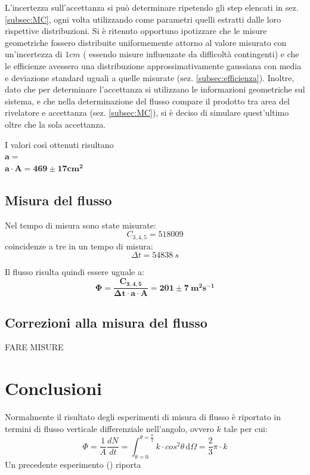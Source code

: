 \documentclass[11pt]{article}
\begin{document}
L'incertezza sull'accettanza si può determinare ripetendo gli step elencati in sez. \ref{subsec:MC}, ogni volta utilizzando come parametri quelli estratti dalle loro rispettive distribuzioni. Si è ritenuto opportuno ipotizzare che le misure geometriche fossero distribuite uniformemente attorno al valore misurato con un'incertezza di $1 cm$ ( essendo misure influenzate da difficoltà contingenti) e che le efficienze avessero una distribuzione approssimativamente gaussiana con media e deviazione standard uguali a quelle misurate (sez. \ref{subsec:efficienza}). Inoltre, dato che per determinare l'accettanza si utilizzano le informazioni geometriche sul sistema, e che nella determinazione del flusso compare il prodotto tra area del rivelatore e accettanza (sez. \ref{subsec:MC}), si è deciso di simulare quest'ultimo oltre che la sola accettanza.

I valori così ottenuti risultano \\
$
\mathbf{a = } 
$
\\
$
\mathbf{ a \cdot A =  469 \pm 17 cm^2}
$


\subsection{Misura del flusso}
Nel tempo di misura sono state misurate: \\
\begin{equation}
C_{3,4,5} = 518009
\nonumber
\end{equation}
coincidenze a tre in un tempo di misura: \\
\begin{equation}
\Delta t = 54838 \ s
\nonumber
\end{equation}

Il flusso risulta quindi essere uguale a: \\
\begin{equation}
\mathbf{\Phi = \frac{C_{3,4,5}}{\Delta t \cdot a \cdot A} = 201 \pm 7 \ m^2 s^{-1}} 
\nonumber
\end{equation}

\subsection{Correzioni alla misura del flusso}
FARE MISURE

\section{Conclusioni}
Normalmente il risultato degli esperimenti di misura di flusso è riportato in termini di flusso verticale differenziale nell'angolo, ovvero $k$ tale per cui:
\begin{equation}
\Phi = \frac{1}{A}\frac{dN}{dt}=\int_{\theta=0}^{\theta=\frac{\pi}{2}}  \! k\cdot cos^2{\theta} \, \mathrm{d}\Omega = \frac{2}{3}\pi\cdot k
\end{equation}
Un precedente esperimento (\cite{Flusso_int}) riporta 



\end{document}
